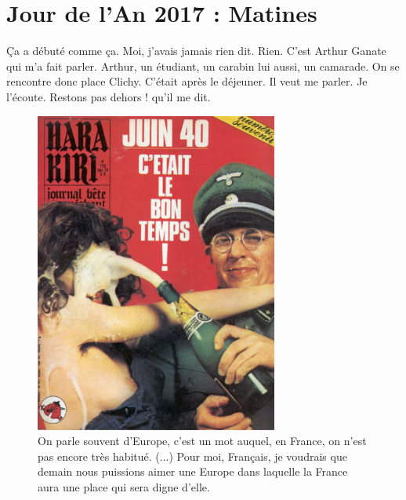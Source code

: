 \documentclass[a4paper,footinbib,final,openany,final,12pt]{book}
\begin{document}
\section{Jour de l'An 2017 : Matines}

 {\c{C}}a a d{\'{e}}but{\'{e}} comme {\c{c}}a. Moi, j'avais jamais rien dit. Rien. C'est Arthur Ganate qui m'a fait parler. Arthur, un {\'{e}}tudiant, un carabin lui aussi, un camarade. On se rencontre donc place Clichy. C'{\'{e}}tait apr{\`{e}}s le d{\'{e}}jeuner. Il veut me parler. Je l'{\'{e}}coute. \og Restons pas dehors ! qu'il me dit.

\begin{figure}[!htb]
\begin{center}
\includegraphics[width=8cm]{Fig02}
\caption{On parle souvent d'Europe, c'est un mot auquel, en France, on n'est pas encore tr{\`{e}}s habitu{\'{e}}. (...) Pour moi, Fran{\c{c}}ais, je voudrais que demain nous puissions aimer une Europe dans laquelle la France aura une place qui sera digne d'elle.}
\label{Fig2}
\end{center}
\end{figure}
\end{document}
